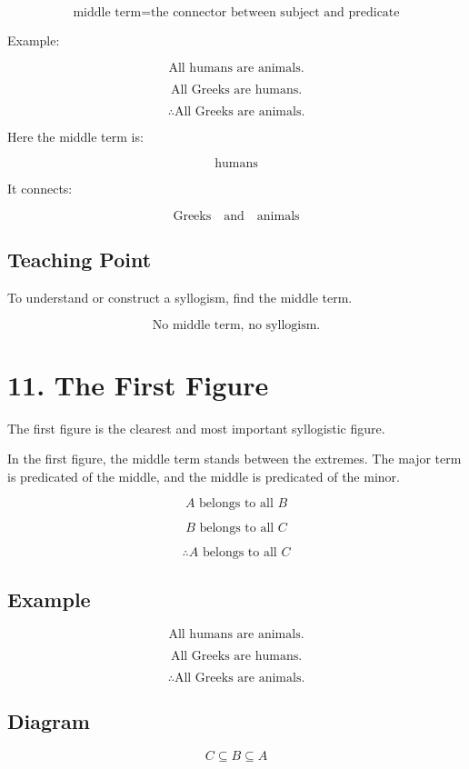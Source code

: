 \documentclass[12pt]{article}
\begin{document}
\[
\boxed{
\text{middle term} = \text{the connector between subject and predicate}
}
\]

Example:

\[
\text{All humans are animals.}
\]

\[
\text{All Greeks are humans.}
\]

\[
\therefore \text{All Greeks are animals.}
\]

Here the middle term is:

\[
\text{humans}
\]

It connects:

\[
\text{Greeks}
\quad \text{and} \quad
\text{animals}
\]

\subsection*{Teaching Point}

To understand or construct a syllogism, find the middle term.

\[
\boxed{
\text{No middle term, no syllogism.}
}
\]

\section*{11. The First Figure}

The first figure is the clearest and most important syllogistic figure.

In the first figure, the middle term stands between the extremes. The major
term is predicated of the middle, and the middle is predicated of the minor.

\[
A \text{ belongs to all } B
\]

\[
B \text{ belongs to all } C
\]

\[
\therefore A \text{ belongs to all } C
\]

\subsection*{Example}

\[
\text{All humans are animals.}
\]

\[
\text{All Greeks are humans.}
\]

\[
\therefore \text{All Greeks are animals.}
\]

\subsection*{Diagram}

\[
C \subseteq B \subseteq A
\]
\end{document}
